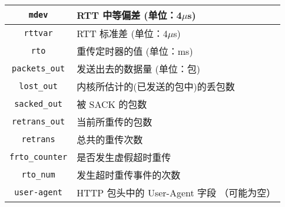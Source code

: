 \documentclass{article}
\begin{document}
\begin{table}[!ht]
\begin{tabular}{|c|l|}
			\texttt{mdev}		& RTT 中等偏差 (单位：4$\mu$s) \\ \hline
			\texttt{rttvar}		& RTT 标准差 (单位：4$\mu$s) \\ \hline
			\texttt{rto}		& 重传定时器的值 (单位：ms) \\ \hline
			\texttt{packets\_out} & 发送出去的数据量 (单位：包) \\ \hline
			\texttt{lost\_out}	& 内核所估计的(已发送的包中)的丢包数 \\ \hline
			\texttt{sacked\_out} & 被 SACK 的包数 \\ \hline
			\texttt{retrans\_out} & 当前所重传的包数 \\ \hline
			\texttt{retrans}	& 总共的重传次数 \\ \hline
			\texttt{frto\_counter} & 是否发生虚假超时重传 \\ \hline
			\texttt{rto\_num}	& 发生超时重传事件的次数 \\ \hline
			\texttt{user-agent}	& HTTP 包头中的 User-Agent 字段 （可能为空） \\ \hline
		\end{tabular}
	\end{table}
\end{document}
